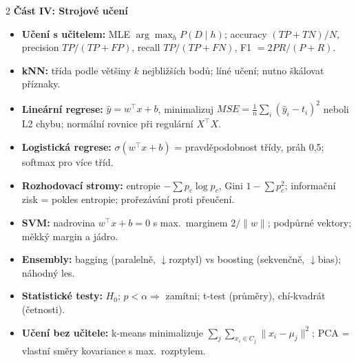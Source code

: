 \begin{multicols}{2}
\textbf{\color{mffblue}Část IV: Strojové učení}
\begin{itemize}[leftmargin=1em,itemsep=1.5pt,topsep=2pt]
  \item \textbf{Učení s učitelem:} MLE $\arg\max_h P(D\mid h)$; accuracy $(TP+TN)/N$, precision $TP/(TP+FP)$, recall $TP/(TP+FN)$, F1 $=2PR/(P+R)$.
  \item \textbf{kNN:} třída podle většiny $k$ nejbližších bodů; líné učení; nutno škálovat příznaky.
  \item \textbf{Lineární regrese:} $\hat y=w^\top x+b$, minimalizuj $MSE=\frac1n\sum_i(\hat y_i-t_i)^2$ neboli L2 chybu; normální rovnice při regulární $X^\top X$.
  \item \textbf{Logistická regrese:} $\sigma(w^\top x+b)$ = pravděpodobnost třídy, práh 0,5; softmax pro více tříd.
  \item \textbf{Rozhodovací stromy:} entropie $-\sum p_c\log p_c$, Gini $1-\sum p_c^2$; informační zisk = pokles entropie; prořezávání proti přeučení.
  \item \textbf{SVM:} nadrovina $w^\top x+b=0$ s max.\ marginem $2/\|w\|$; podpůrné vektory; měkký margin a jádro.
  \item \textbf{Ensembly:} bagging (paralelně, $\downarrow$rozptyl) vs boosting (sekvenčně, $\downarrow$bias); náhodný les.
  \item \textbf{Statistické testy:} $H_0$; $p<\alpha \Rightarrow$ zamítni; t-test (průměry), chí-kvadrát (četnosti).
  \item \textbf{Učení bez učitele:} k-means minimalizuje $\sum_j\sum_{x_i\in C_j}\|x_i-\mu_j\|^2$; PCA = vlastní směry kovariance s max.\ rozptylem.
\end{itemize}
\end{multicols}
